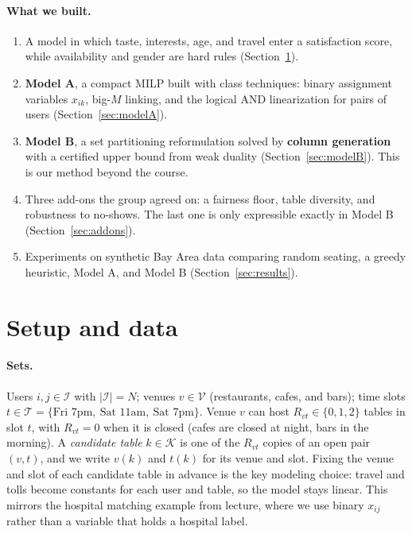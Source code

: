 \documentclass[10pt]{article}
\newcommand{\I}{\mathcal{I}}
\newcommand{\V}{\mathcal{V}}
\newcommand{\T}{\mathcal{T}}
\newcommand{\K}{\mathcal{K}}
\begin{document}
\paragraph{What we built.}
\begin{enumerate}[leftmargin=*]
\item A model in which taste, interests, age, and travel enter a satisfaction score, while availability and gender are hard rules (Section~\ref{sec:setup}).
\item \textbf{Model A}, a compact MILP built with class techniques: binary assignment variables $x_{ik}$, big-$M$ linking, and the logical AND linearization for pairs of users (Section~\ref{sec:modelA}).
\item \textbf{Model B}, a set partitioning reformulation solved by \textbf{column generation} with a certified upper bound from weak duality (Section~\ref{sec:modelB}). This is our method beyond the course.
\item Three add-ons the group agreed on: a fairness floor, table diversity, and robustness to no-shows. The last one is only expressible exactly in Model B (Section~\ref{sec:addons}).
\item Experiments on synthetic Bay Area data comparing random seating, a greedy heuristic, Model A, and Model B (Section~\ref{sec:results}).
\end{enumerate}

\section{Setup and data}
\label{sec:setup}

\paragraph{Sets.} Users $i,j\in\I$ with $|\I|=N$; venues $v\in\V$ (restaurants, cafes, and bars); time slots $t\in\T=\{\text{Fri 7pm},\ \text{Sat 11am},\ \text{Sat 7pm}\}$. Venue $v$ can host $R_{vt}\in\{0,1,2\}$ tables in slot $t$, with $R_{vt}=0$ when it is closed (cafes are closed at night, bars in the morning). A \emph{candidate table} $k\in\K$ is one of the $R_{vt}$ copies of an open pair $(v,t)$, and we write $v(k)$ and $t(k)$ for its venue and slot. Fixing the venue and slot of each candidate table in advance is the key modeling choice: travel and tolls become constants for each user and table, so the model stays linear. This mirrors the hospital matching example from lecture, where we use binary $x_{ij}$ rather than a variable that holds a hospital label.
\end{document}
